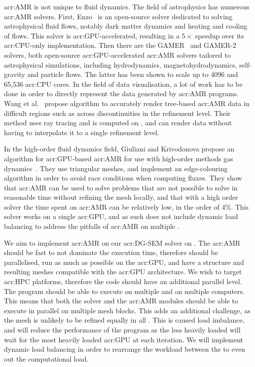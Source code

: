 \Acrlong{acr:AMR} is not unique to fluid dynamics. The field of astrophysics has numerous
\acrshort{acr:AMR} solvers. First, Enzo~\cite{Bryan2014} is an open-source solver dedicated to
solving astrophysical fluid flows, notably dark matter dynamics and heating and cooling of flows.
This solver is \acrshort{acr:GPU}-accelerated, resulting in a \(5 \times \) speedup over its
\acrshort{acr:CPU}-only implementation. Then there are the GAMER~\cite{Schive2010} and
GAMER-2~\cite{Schive2018} solvers, both open-source \acrshort{acr:GPU}-accelerated
\acrshort{acr:AMR} solvers tailored to astrophysical simulations, including hydrodynamics,
magnetohydrodynamics, self-gravity and particle flows. The latter has been shown to scale up to 4096
 and 65,536 \acrshort{acr:CPU} cores. In the field of data visualisation, a lot
of work has to be done in order to directly represent the data generated by \acrshort{acr:AMR}
programs. Wang et al.~\cite{Wang2020} propose algorithm to accurately render tree-based
\acrshort{acr:AMR} data in difficult regions such as across discontinuities in the refinement level.
Their method uses ray tracing and is computed on , and can render data without
having to interpolate it to a single refinement level.

In the high-order fluid dynamics field, Giuliani and Krivodonova propose an algorithm for
\acrshort{acr:GPU}-based \acrlong{acr:AMR} for use with high-order methods gas
dynamics~\cite{Giuliani2019}. They use triangular meshes, and implement an edge-colouring algorithm
in order to avoid race conditions when computing fluxes. They show that \acrshort{acr:AMR} can be
used to solve problems that are not possible to solve in reasonable time without refining the mesh
locally, and that with a high order solver the time spent on \acrshort{acr:AMR} can be relatively
low, in the order of 4\%. This solver works on a single \acrshort{acr:GPU}, and as such does not
include dynamic load balancing to address the pitfalls of \acrshort{acr:AMR} on multiple
.

We aim to implement \acrshort{acr:AMR} on our \acrshort{acr:DG-SEM} solver on .
The \acrshort{acr:AMR} should be fast to not dominate the execution time, therefore should be
parallelised, run as much as possible on the \acrshort{acr:GPU}, and have a structure and resulting
meshes compatible with the \acrshort{acr:GPU} architecture. We wish to target \acrshort{acr:HPC}
platforms, therefore the code should have an additional parallel level. The program should be able
to execute on multiple  and on multiple computers. This means that
both the solver and the \acrshort{acr:AMR} modules should be able to execute in parallel on multiple
mesh blocks. This adds an additional challenge, as the mesh is unlikely to be refined equally in all
. This is caused load imbalance, and will reduce the performance of the program
as the less heavily loaded  will wait for the most heavily loaded
\acrshort{acr:GPU} at each iteration. We will implement dynamic load balancing in order to rearrange
the workload between the  to even out the computational load.

